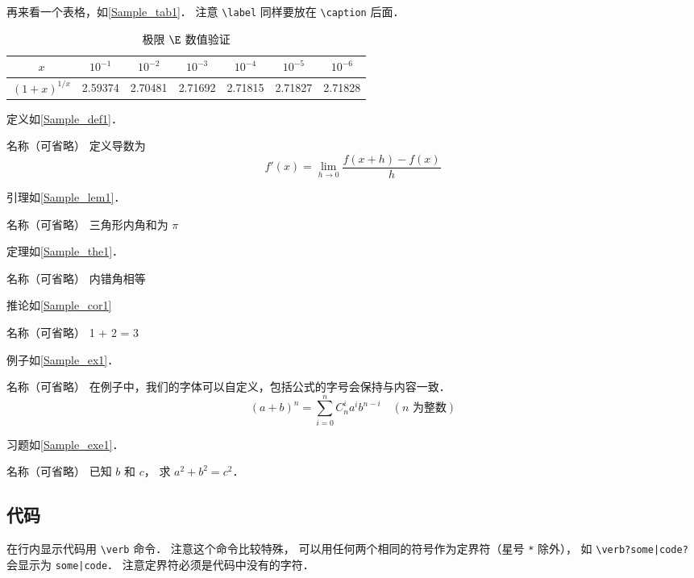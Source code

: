 再来看一个表格，如\autoref{Sample_tab1}． 注意 \verb|\label| 同样要放在 \verb|\caption| 后面．
\begin{table}[ht]
\centering
\caption{极限 $\E$ 数值验证}\label{Sample_tab1}
\begin{tabular}{|c|c|c|c|c|c|c|}
\hline
$x$ & ${10^{ - 1}}$ & ${10^{ - 2}}$ & ${10^{ - 3}}$ & ${10^{ - 4}}$ & ${10^{ - 5}}$ & ${10^{ - 6}}$ \\
\hline
$(1 + x)^{1/x}$ & 2.59374 & 2.70481 & 2.71692 & 2.71815 & 2.71827 & 2.71828 \\
\hline
\end{tabular}
\end{table}

定义如\autoref{Sample_def1}．
\begin{definition}{名称（可省略）}\label{Sample_def1}
定义导数为
\begin{equation}
f'(x) = \lim_{h \to 0} \frac{f(x + h) - f(x)}{h}
\end{equation}
\end{definition}

引理如\autoref{Sample_lem1}．
\begin{lemma}{名称（可省略）}\label{Sample_lem1}
三角形内角和为 $\pi$
\end{lemma}

定理如\autoref{Sample_the1}．
\begin{theorem}{名称（可省略）}\label{Sample_the1}
内错角相等
\end{theorem}

推论如\autoref{Sample_cor1}
\begin{corollary}{名称（可省略）}\label{Sample_cor1}
1 + 2 = 3
\end{corollary}

例子如\autoref{Sample_ex1}． 
\begin{example}{名称（可省略）}\label{Sample_ex1}
在例子中，我们的字体可以自定义，包括公式的字号会保持与内容一致．
\begin{equation}
(a+b)^n = \sum_{i=0}^n C_n^i a^i b^{n-i} \quad (\text{$n$ 为整数})
\end{equation}
\end{example}

习题如\autoref{Sample_exe1}． 
\begin{exercise}{名称（可省略）}\label{Sample_exe1}
已知 $b$ 和 $c$， 求 $a^2 + b^2 = c^2$．
\end{exercise}

\subsection{代码}
在行内显示代码用 \verb|\verb| 命令． 注意这个命令比较特殊， 可以用任何两个相同的符号作为定界符（星号 \verb|*| 除外）， 如 \verb+\verb?some|code?+ 会显示为 \verb?some|code?． 注意定界符必须是代码中没有的字符．

